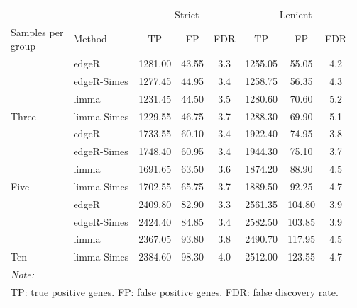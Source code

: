 
\begin{tabular}[t]{llcccccc}
\toprule
\multicolumn{2}{c}{ } & \multicolumn{3}{c}{Strict} & \multicolumn{3}{c}{Lenient} \\
\cmidrule(l{3pt}r{3pt}){3-5} \cmidrule(l{3pt}r{3pt}){6-8}
\makecell[l]{Samples per\\group} & Method & TP & FP & FDR & TP & FP & FDR\\
\midrule
 & edgeR & 1281.00 & 43.55 & 3.3 & 1255.05 & 55.05 & 4.2\\

 & edgeR-Simes & 1277.45 & 44.95 & 3.4 & 1258.75 & 56.35 & 4.3\\

 & limma & 1231.45 & 44.50 & 3.5 & 1280.60 & 70.60 & 5.2\\

\multirow{-4}{*}{\raggedright\arraybackslash Three} & limma-Simes & 1229.55 & 46.75 & 3.7 & 1288.30 & 69.90 & 5.1\\
\cmidrule{1-8}
 & edgeR & 1733.55 & 60.10 & 3.4 & 1922.40 & 74.95 & 3.8\\

 & edgeR-Simes & 1748.40 & 60.95 & 3.4 & 1944.30 & 75.10 & 3.7\\

 & limma & 1691.65 & 63.50 & 3.6 & 1874.20 & 88.90 & 4.5\\

\multirow{-4}{*}{\raggedright\arraybackslash Five} & limma-Simes & 1702.55 & 65.75 & 3.7 & 1889.50 & 92.25 & 4.7\\
\cmidrule{1-8}
 & edgeR & 2409.80 & 82.90 & 3.3 & 2561.35 & 104.80 & 3.9\\

 & edgeR-Simes & 2424.40 & 84.85 & 3.4 & 2582.50 & 103.85 & 3.9\\

 & limma & 2367.05 & 93.80 & 3.8 & 2490.70 & 117.95 & 4.5\\

\multirow{-4}{*}{\raggedright\arraybackslash Ten} & limma-Simes & 2384.60 & 98.30 & 4.0 & 2512.00 & 123.55 & 4.7\\
\bottomrule
\multicolumn{8}{l}{\rule{0pt}{1em}\textit{Note: }}\\
\multicolumn{8}{l}{\rule{0pt}{1em}TP: true positive genes. FP: false positive genes. FDR: false discovery rate.}\\
\end{tabular}
